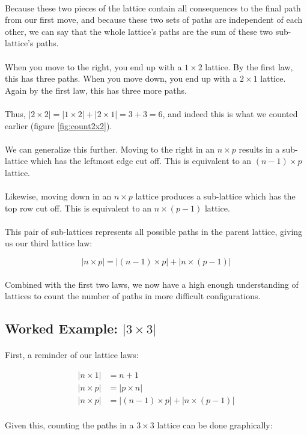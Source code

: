 \documentclass[12pt]{article}
\newcommand{\p}{\paragraph{}}
\begin{document}
			\p Because these two pieces of the lattice contain all consequences to the final path from our first move, and because these two sets of paths are independent of each other, we can say that the whole lattice's paths are the sum of these two sub-lattice's paths.
			
			\p When you move to the right, you end up with a $1 \times 2$ lattice. By the first law, this has three paths. When you move down, you end up with a $2\times1$ lattice. Again by the first law, this has three more paths.
			
			\p Thus, $|2\times2| = |1\times2| + |2\times1| = 3 + 3 = 6$, and indeed this is what we counted earlier (figure \ref{fig:count2x2}).
			
			\p We can generalize this further. Moving to the right in an $n \times p$ results in a sub-lattice which has the leftmost edge cut off. This is equivalent to an $(n-1) \times p$ lattice.
			
			\p Likewise, moving down in an $n \times p$ lattice produces a sub-lattice which has the top row cut off. This is equivalent to an $n \times (p-1)$ lattice.
			
			\p This pair of sub-lattices represents all possible paths in the parent lattice, giving us our third lattice law:
			
			\begin{equation*}
				|n \times p| = |(n-1) \times p| + |n \times (p-1)|
			\end{equation*}
			
			\p Combined with the first two laws, we now have a high enough understanding of lattices to count the number of paths in more difficult configurations.
			
		\subsection{Worked Example: $|3 \times 3|$}
		
			\p First, a reminder of our lattice laws:
			
			\begin{align*}
				|n \times 1| &= n + 1\\
				|n \times p| &= |p \times n| \\
				|n \times p| &= |(n-1) \times p| + |n \times (p - 1)|
			\end{align*}
			
			\p Given this, counting the paths in a $3\times3$ lattice can be done graphically:
			
\end{document}
